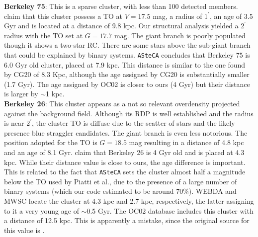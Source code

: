 \documentclass[referee]{aa}
\begin{document}
  \noindent \textbf{Berkeley 75}: This is a sparse cluster, with less than 100 detected
  members. \cite{Carraro_2005} claim that this cluster possess
  a TO at $V= 17.5$ mag, a radius of $1^{\prime}$, an age of 3.5 Gyr and is
  located at a distance of 9.8 kpc.
  Our structural analysis yielded a $2^{\prime}$ radius with the TO set at
  $G=17.7$ mag. The giant branch is poorly populated though it shows a two-star
  RC. There are some stars above the sub-giant branch that could be explained
  by binary systems. \texttt{ASteCA} concludes that Berkeley 75 is 6.0 Gyr old
  cluster, placed at 7.9 kpc. This distance is similar to the one found by CG20
  of 8.3 Kpc, although the age assigned by CG20 is substantially smaller (1.7
  Gyr). The age assigned by OC02 is closer to ours (4 Gyr) but their distance is
  larger by $\sim$1 kpc.\\

  \noindent \textbf{Berkeley 26}: This cluster appears as a not so relevant overdensity
  projected against the background field. Although its RDP is well established
  and the radius is near $2^{\prime}$, the cluster TO is diffuse due to the
  scatter of stars and the likely presence blue straggler candidates. The
  giant branch is even less notorious.
  The position adopted for the TO is $G=18.5$ mag resulting in a distance of 4.8
  kpc and an age of 8.1 Gyr. \cite{Piatti_2010} claim that Berkeley 26 is 4 Gyr
  old and is placed at 4.3 kpc. While their distance value is close to ours, the
  age difference is important. This is related to the fact that \texttt{ASteCA}
  sets the cluster almost half a magnitude below the TO used by Piatti et al.,
  due to the presence of a large number of binary systems (which our code
  estimated to be around 70\%).
  WEBDA and MWSC locate the cluster at 4.3 kpc and 2.7 kpc, respectively, the
  latter assigning to it a very young age of $\sim$0.5 Gyr. The OC02 database
  includes this cluster with a distance of 12.5 kpc. This is apparently
  a mistake, since the original source for this value is \cite{Piatti_2010}.\\
\end{document}
